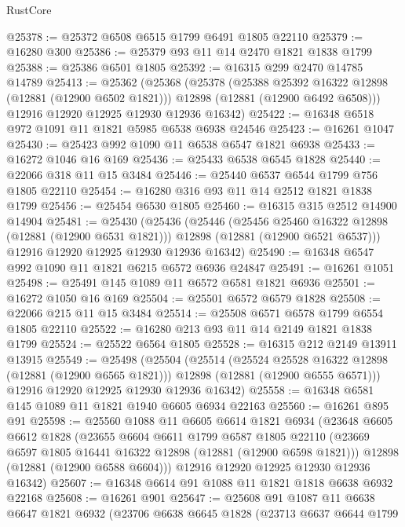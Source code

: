 \begin{lexlean}{RustCore}
\begin{coremodule}
@25378 := @25372 @6508 @6515 @1799 @6491 @1805 @22110
@25379 := @16280 @300
@25386 := @25379 @93 @11 @14 @2470 @1821 @1838 @1799
@25388 := @25386 @6501 @1805
@25392 := @16315 @299 @2470 @14785 @14789
@25413 := @25362
    (@25368
      (@25378
        (@25388 @25392 @16322 @12898 (@12881 (@12900 @6502 @1821)))
        @12898
        (@12881 (@12900 @6492 @6508)))
      @12916
      @12920
      @12925
      @12930
      @12936
      @16342)
@25422 := @16348 @6518 @972 @1091 @11 @1821 @5985 @6538 @6938 @24546
@25423 := @16261 @1047
@25430 := @25423 @992 @1090 @11 @6538 @6547 @1821 @6938
@25433 := @16272 @1046 @16 @169
@25436 := @25433 @6538 @6545 @1828
@25440 := @22066 @318 @11 @15 @3484
@25446 := @25440 @6537 @6544 @1799 @756 @1805 @22110
@25454 := @16280 @316 @93 @11 @14 @2512 @1821 @1838 @1799
@25456 := @25454 @6530 @1805
@25460 := @16315 @315 @2512 @14900 @14904
@25481 := @25430
    (@25436
      (@25446
        (@25456 @25460 @16322 @12898 (@12881 (@12900 @6531 @1821)))
        @12898
        (@12881 (@12900 @6521 @6537)))
      @12916
      @12920
      @12925
      @12930
      @12936
      @16342)
@25490 := @16348 @6547 @992 @1090 @11 @1821 @6215 @6572 @6936 @24847
@25491 := @16261 @1051
@25498 := @25491 @145 @1089 @11 @6572 @6581 @1821 @6936
@25501 := @16272 @1050 @16 @169
@25504 := @25501 @6572 @6579 @1828
@25508 := @22066 @215 @11 @15 @3484
@25514 := @25508 @6571 @6578 @1799 @6554 @1805 @22110
@25522 := @16280 @213 @93 @11 @14 @2149 @1821 @1838 @1799
@25524 := @25522 @6564 @1805
@25528 := @16315 @212 @2149 @13911 @13915
@25549 := @25498
    (@25504
      (@25514
        (@25524 @25528 @16322 @12898 (@12881 (@12900 @6565 @1821)))
        @12898
        (@12881 (@12900 @6555 @6571)))
      @12916
      @12920
      @12925
      @12930
      @12936
      @16342)
@25558 := @16348 @6581 @145 @1089 @11 @1821 @1940 @6605 @6934 @22163
@25560 := @16261 @895 @91
@25598 := @25560
    @1088
    @11
    @6605
    @6614
    @1821
    @6934
    (@23648
      @6605
      @6612
      @1828
      (@23655
        @6604
        @6611
        @1799
        @6587
        @1805
        @22110
        (@23669 @6597 @1805 @16441 @16322 @12898 (@12881 (@12900 @6598 @1821)))
        @12898
        (@12881 (@12900 @6588 @6604)))
      @12916
      @12920
      @12925
      @12930
      @12936
      @16342)
@25607 := @16348 @6614 @91 @1088 @11 @1821 @1818 @6638 @6932 @22168
@25608 := @16261 @901
@25647 := @25608
    @91
    @1087
    @11
    @6638
    @6647
    @1821
    @6932
    (@23706
      @6638
      @6645
      @1828
      (@23713
        @6637
        @6644
        @1799

\end{coremodule}
\end{lexlean}
